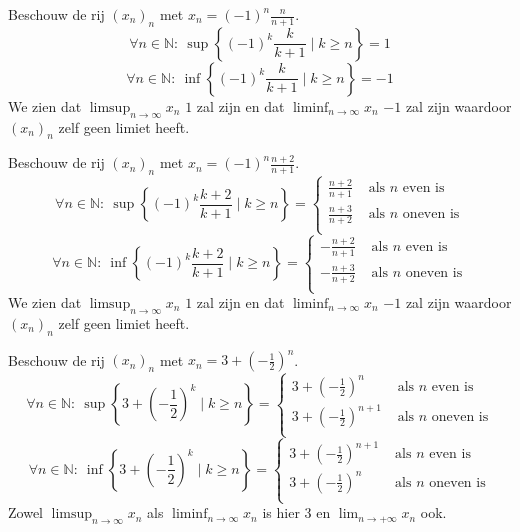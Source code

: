 \documentclass[main.tex]{subfiles}
\begin{document}
\begin{vb}
  Beschouw de rij $(x_{n})_{n}$ met $x_{n}=(-1)^{n}\frac{n}{n+1}$.
  \[ \forall n\in \mathbb{N}:\ \sup \left\{ (-1)^{k}\frac{k}{k+1} \mid k \ge n \right\} = 1 \]
  \[ \forall n\in \mathbb{N}:\ \inf \left\{ (-1)^{k}\frac{k}{k+1} \mid k \ge n \right\} = -1 \]
  We zien dat $\limsup_{n\rightarrow \infty}x_{n}$ $1$ zal zijn en dat $\liminf_{n\rightarrow \infty} x_{n}$ $-1$ zal zijn waardoor $(x_{n})_{n}$ zelf geen limiet heeft.
\end{vb}

\begin{vb}
  Beschouw de rij $(x_{n})_{n}$ met $x_{n} = (-1)^{n}\frac{n+2}{n+1}$.
  \[
  \forall n\in \mathbb{N}:\ \sup \left\{ (-1)^{k}\frac{k+2}{k+1} \mid k \ge n \right\}
  =
  \begin{cases}
    \frac{n+2}{n+1} & \text{ als $n$ even is}\\
    \frac{n+3}{n+2} & \text{ als $n$ oneven is}\\
  \end{cases}
  \]
  \[
  \forall n\in \mathbb{N}:\ \inf \left\{ (-1)^{k}\frac{k+2}{k+1} \mid k \ge n \right\}
  =
  \begin{cases}
    -\frac{n+2}{n+1} & \text{ als $n$ even is}\\
    -\frac{n+3}{n+2} & \text{ als $n$ oneven is}\\
  \end{cases}
  \]
  We zien dat $\limsup_{n\rightarrow \infty}x_{n}$ $1$ zal zijn en dat $\liminf_{n\rightarrow \infty} x_{n}$ $-1$ zal zijn waardoor $(x_{n})_{n}$ zelf geen limiet heeft.
\end{vb}

\begin{vb}
  Beschouw de rij $(x_{n})_{n}$ met $x_{n} = 3 + \left(-\frac{1}{2}\right)^{n}$.
  \[
  \forall n\in \mathbb{N}:\ \sup \left\{ 3 + \left(-\frac{1}{2}\right)^{k} \mid k \ge n \right\}
  =
  \begin{cases}
    3+\left(-\frac{1}{2}\right)^{n} & \text{ als $n$ even is}\\
    3+\left(-\frac{1}{2}\right)^{n+1} & \text{ als $n$ oneven is}\\
  \end{cases}
  \]
  \[
  \forall n\in \mathbb{N}:\ \inf \left\{ 3 + \left(-\frac{1}{2}\right)^{k} \mid k \ge n \right\}
  =
  \begin{cases}
    3+\left(-\frac{1}{2}\right)^{n+1} & \text{ als $n$ even is}\\
    3+\left(-\frac{1}{2}\right)^{n} & \text{ als $n$ oneven is}\\
  \end{cases}
  \]
  Zowel $\limsup_{n\rightarrow \infty}x_{n}$ als $\liminf_{n\rightarrow \infty} x_{n}$ is hier $3$ en $\lim_{n\rightarrow +\infty}x_{n}$ ook.
\end{vb}
\end{document}
